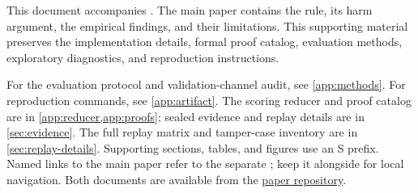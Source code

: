 This document accompanies . The main paper contains the rule, its harm argument, the empirical findings, and their limitations. This supporting material preserves the implementation details, formal proof catalog, evaluation methods, exploratory diagnostics, and reproduction instructions.

For the evaluation protocol and validation-channel audit, see \cref{app:methods}. For reproduction commands, see \cref{app:artifact}. The scoring reducer and proof catalog are in \cref{app:reducer,app:proofs}; sealed evidence and replay details are in \cref{sec:evidence}. The full replay matrix and tamper-case inventory are in \cref{sec:replay-details}. Supporting sections, tables, and figures use an S prefix. Named links to the main paper refer to the separate ; keep it alongside  for local navigation. Both documents are available from the \href{https://github.com/grainulation/papers/tree/main/papers/verify-then-vote}{paper repository}.
